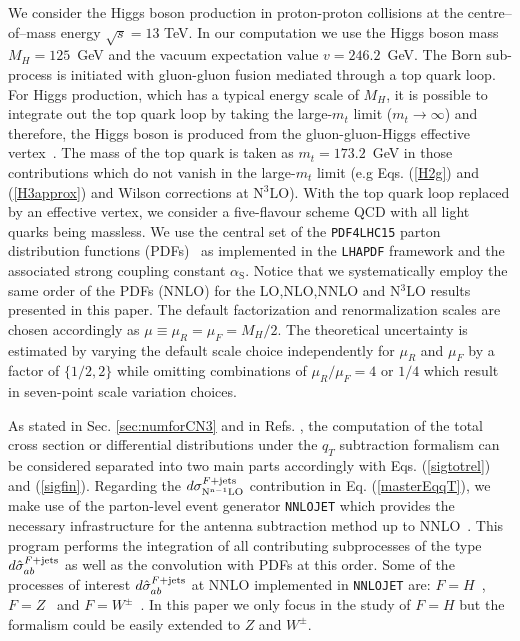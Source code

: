 \documentclass[12pt]{article}
\newcommand\as{\alpha_{\mathrm{S}}}
\def\qt{q_T}
\begin{document}
We consider the Higgs boson production in proton-proton collisions at the centre--of--mass energy $\sqrt{s}=13$ TeV. In our computation we use the Higgs boson mass  $M_H= 125$~GeV and the vacuum expectation value  $v=246.2$~GeV. The Born sub-process is initiated with gluon-gluon fusion mediated through a top quark loop. For Higgs production, which has a typical energy scale of $M_H$, it is possible to integrate out the top quark loop by taking the large-$m_t$ limit ($m_{t}\rightarrow \infty$) and therefore, the Higgs boson is produced from the gluon-gluon-Higgs effective vertex~\cite{Heft}. The mass of the top quark is taken as $m_t = 173.2$~GeV in those contributions which do not vanish in the large-$m_t$ limit (e.g  Eqs. (\ref{H2g}) and  (\ref{H3approx}) and Wilson corrections at N$^3$LO). With the top quark loop replaced by an effective vertex, we consider a five-flavour scheme QCD with all light quarks being massless. We use the central set of the \texttt{PDF4LHC15} parton distribution functions (PDFs)~\cite{nnpdf} as implemented in the \texttt{LHAPDF} framework \cite{Buckley:2014ana} and the associated strong coupling constant $\as$. Notice that we systematically employ the same order of the PDFs (NNLO) for the LO,NLO,NNLO and N$^{3}$LO results presented in this paper. The default factorization and renormalization scales are chosen accordingly as $\mu \equiv \mu_R = \mu_F =  M_H / 2$. The theoretical uncertainty is estimated by varying the default scale choice independently for $\mu_R$ and $\mu_F$ by a factor of $\{1/2,2\}$ while omitting combinations of $\mu_R/\mu_F = 4$ or $1/4$ which result in seven-point scale variation choices. 

As stated in Sec. \ref{sec:numforCN3} and in Refs. \cite{Bozzi:2005wk,Catani:2007vq}, the computation of the total cross section or differential distributions under the  $\qt$ subtraction formalism can be considered separated into two main parts accordingly with Eqs. (\ref{sigtotrel}) and  (\ref{sigfin}). Regarding the $d{\sigma}_{\rm{N}^{n-1}\rm{LO}}^{F+{\rm jets}}$ contribution in Eq. (\ref{masterEqqT}), we make use of the parton-level event generator \texttt{NNLOJET} which provides the necessary infrastructure for the antenna subtraction method up to NNLO~\cite{Antenna:method}. This program performs the integration of all contributing subprocesses of the type  $d{\hat \sigma}_{ab}^{F+{\rm jets}}$ as well as the convolution with PDFs at this order. Some of the processes of interest $d{\hat \sigma}_{ab}^{F+{\rm jets}}$ at NNLO implemented in \texttt{NNLOJET} are: $F=H$~\cite{Chen:2014gva,Chen:2016zka}, $F=Z$~\cite{Ridder:2015dxa,Gehrmann-DeRidder:2016jns,Gehrmann-DeRidder:2017mvr} and $F=W^{\pm}$~\cite{Gehrmann-DeRidder:2017mvr}. In this paper we only focus in the study of $F=H$ but the formalism could be easily extended  to $Z$ and $W^{\pm}$. 
\end{document}
